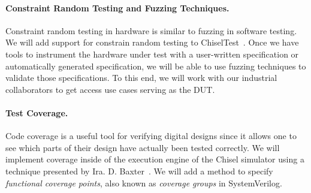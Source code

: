 \documentclass[fleqn,12pt]{article}
\begin{document}
\paragraph{Constraint Random Testing and Fuzzing Techniques.}

Constraint random testing in hardware is similar to fuzzing in software testing.
We will add support for constrain random testing to ChiselTest~\cite{chisel:tester2}.
Once we have tools to instrument the hardware under test with a user-written
specification or automatically generated specification, we will be able to use fuzzing techniques
to validate those specifications. To this end, we will work
with our industrial collaborators to get access use cases serving
as the DUT.

\paragraph{Test Coverage.}

Code coverage is a useful tool for verifying digital designs
since it allows one to see which parts of their design have actually been tested correctly.
We will implement coverage inside of the execution engine of the Chisel simulator using a technique
presented by Ira. D. Baxter~\cite{branch-cov-made-easy:2002}.
We will add a method to specify \textit{functional coverage points}, also known as
\textit{coverage groups} in SystemVerilog.



%
\end{document}
